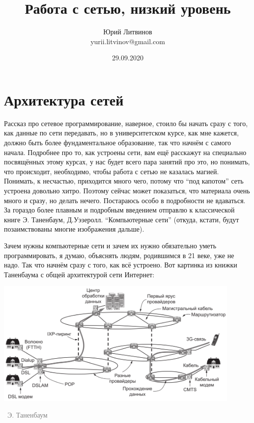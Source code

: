 \documentclass[a5paper]{article}
\title{Работа с сетью, низкий уровень}
\author{Юрий Литвинов\\\small{yurii.litvinov@gmail.com}}
\date{29.09.2020}
\newcommand{\attribution}[1] {
\vspace{-5mm}\begin{flushright}\begin{scriptsize}\textcolor{gray}{\textcopyright\, #1}\end{scriptsize}\end{flushright}
}
\begin{document}
\maketitle
\thispagestyle{empty}

\section{Архитектура сетей}

Рассказ про сетевое программирование, наверное, стоило бы начать сразу с того, как данные по сети передавать, но в университетском курсе, как мне кажется, должно быть более фундаментальное образование, так что начнём с самого начала. Подробнее про то, как устроены сети, вам ещё расскажут на специально посвящённых этому курсах, у нас будет всего пара занятий про это, но понимать, что происходит, необходимо, чтобы работа с сетью не казалась магией. Понимать, к несчастью, приходится много чего, потому что ``под капотом'' сеть устроена довольно хитро. Поэтому сейчас может показаться, что материала очень много и сразу, но делать нечего. Постараюсь особо в подробности не вдаваться. За гораздо более плавным и подробным введением отправлю к классической книге Э. Таненбаум, Д.Уэзеролл. ``Компьютерные сети'' (откуда, кстати, будут позаимствованы многие изображения дальше).

Зачем нужны компьютерные сети и зачем их нужно обязательно уметь программировать, я думаю, объяснять людям, родившимся в 21 веке, уже не надо. Так что начнём сразу с того, как всё устроено. Вот картинка из книжки Таненбаума с общей архитектурой сети Интернет:
\begin{center}
    \includegraphics[width=0.9\textwidth]{internetArchitecture.png}
    \attribution{Э. Таненбаум}
\end{center}
\end{document}
